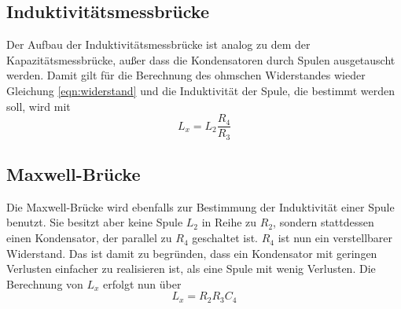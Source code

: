     \subsection{Induktivitätsmessbrücke}
    Der Aufbau der Induktivitätsmessbrücke ist analog zu dem der Kapazitätsmessbrücke, außer dass die Kondensatoren durch Spulen ausgetauscht werden.
    Damit gilt für die Berechnung des ohmschen Widerstandes wieder Gleichung \ref{eqn:widerstand} und die Induktivität der Spule, die bestimmt werden soll, wird mit 
    \begin{equation}
        L_x=L_2 \frac{R_4}{R_3}
        \label{eqn:Induktivität}
    \end{equation}

    \subsection{Maxwell-Brücke}
    Die Maxwell-Brücke wird ebenfalls zur Bestimmung der Induktivität einer Spule benutzt.
    Sie besitzt aber keine Spule $L_2$ in Reihe zu $R_2$, sondern stattdessen einen Kondensator, der parallel zu $R_4$ geschaltet ist.
    $R_4$ ist nun ein verstellbarer Widerstand. Das ist damit zu begründen, dass ein Kondensator mit geringen Verlusten einfacher zu realisieren ist, als eine Spule mit wenig Verlusten.
    Die Berechnung von $L_x$ erfolgt nun über
    \begin{equation}
        L_x=R_2 R_3 C_4
    \end{equation}

